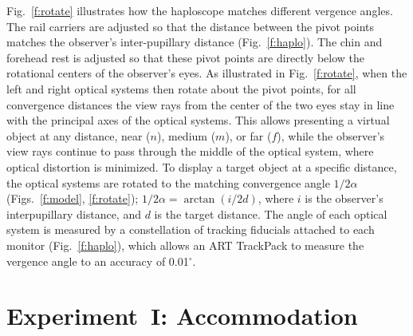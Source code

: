 \documentclass[10pt,journal,compsoc]{IEEEtran}
\begin{document}
Fig.~\ref{f:rotate} illustrates how the haploscope matches different vergence angles.  The rail carriers are adjusted so that the distance between the pivot points matches the observer's inter-pupillary distance (Fig.~\ref{f:haplo}).  The chin and forehead rest is adjusted so that these pivot points are directly below the rotational centers of the observer's eyes.  As illustrated in Fig.~\ref{f:rotate}, when the left and right optical systems then rotate about the pivot points, for all convergence distances the view rays from the center of the two eyes stay in line with the principal axes of the optical systems.
This allows presenting a virtual object at any distance, near ($n$), medium ($m$), or far ($f$), while the observer's view rays continue to pass through the middle of the optical system, where optical distortion is minimized.  To display a target object at a specific distance, the optical systems are rotated to the matching convergence angle $1/2\alpha$ (Figs.~\ref{f:model}, \ref{f:rotate}); $1/2\alpha = \arctan(i/2d)$, where $i$ is the observer's interpupillary distance, and $d$ is the target distance.  The angle of each optical system is measured by a constellation of tracking fiducials attached to each monitor (Fig.~\ref{f:haplo}), which allows an ART TrackPack to measure the vergence angle to an accuracy of 0.01$^{\circ}$.



\section {Experiment~I: Accommodation}
\label{s:exI}
\end{document}
